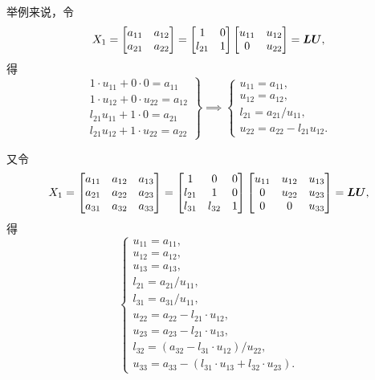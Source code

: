 举例来说，令\[
	X_1 = \begin{bmatrix}
		a_{11} & a_{12} \\
		a_{21} & a_{22}
	\end{bmatrix}
	= \begin{bmatrix}
		1 & 0 \\
		l_{21} & 1
	\end{bmatrix}
	\begin{bmatrix}
		u_{11} & u_{12} \\
		0 & u_{22}
	\end{bmatrix}
	= \boldsymbol{L} \boldsymbol{U},
\]
得\[
	\left.\begin{array}{r}
		1 \cdot u_{11} + 0 \cdot 0 = a_{11} \\
		1 \cdot u_{12} + 0 \cdot u_{22} = a_{12} \\
		l_{21} u_{11} + 1 \cdot 0 = a_{21} \\
		l_{21} u_{12} + 1 \cdot u_{22} = a_{22}
	\end{array}\right\}
	\implies
	\left\{\begin{array}{l}
		u_{11} = a_{11}, \\
		u_{12} = a_{12}, \\
		l_{21} = a_{21} / u_{11}, \\
		u_{22} = a_{22} - l_{21} u_{12}.
	\end{array}\right.
\]

又令\[
	X_1 = \begin{bmatrix}
		a_{11} & a_{12} & a_{13} \\
		a_{21} & a_{22} & a_{23} \\
		a_{31} & a_{32} & a_{33}
	\end{bmatrix}
	= \begin{bmatrix}
		1 & 0 & 0 \\
		l_{21} & 1 & 0 \\
		l_{31} & l_{32} & 1
	\end{bmatrix}
	\begin{bmatrix}
		u_{11} & u_{12} & u_{13} \\
		0 & u_{22} & u_{23} \\
		0 & 0 & u_{33}
	\end{bmatrix} = \boldsymbol{L} \boldsymbol{U},
\]
得\[
	\left\{\begin{array}{l}
		u_{11} = a_{11}, \\
		u_{12} = a_{12}, \\
		u_{13} = a_{13}, \\
		l_{21} = a_{21} / u_{11}, \\
		l_{31} = a_{31} / u_{11}, \\
		u_{22} = a_{22} - l_{21} \cdot u_{12}, \\
		u_{23} = a_{23} - l_{21} \cdot u_{13}, \\
		l_{32} = (a_{32} - l_{31} \cdot u_{12}) / u_{22}, \\
		u_{33} = a_{33} - (l_{31} \cdot u_{13} + l_{32} \cdot u_{23}).
	\end{array}\right.
\]
\endgroup%


